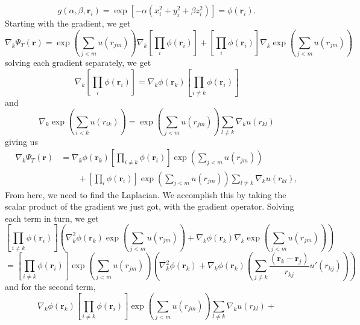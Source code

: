 \documentclass[11pt,a4paper,titlepage]{article}
\begin{document}
\begin{equation*}
    g(\alpha,\beta,\mathbf{r}_i) = \exp{\left[-\alpha(x_i^2+y_i^2+\beta
    z_i^2)\right]}= \phi(\mathbf{r}_i).
\end{equation*}
Starting with the gradient, we get
\begin{equation}
  \nabla_k\Psi_T(\mathbf{r}) = \exp{\left(\sum_{j<m}u(r_{jm})\right)}\nabla_k\left[\prod_{i}\phi(\mathbf{r}_i)\right] + \left[\prod_{i}\phi(\mathbf{r}_i)\right]\nabla_k\exp{\left(\sum_{j<m}u(r_{jm})\right)}
\end{equation}
solving each gradient separately, we get
\begin{equation*}
\nabla_k\left[\prod_{i}\phi(\mathbf{r}_i)\right] = \nabla_k\phi(\mathbf{r}_k)\left[\prod_{i\ne k}\phi(\mathbf{r}_i)\right]
\end{equation*}
and 
\begin{equation*}
\nabla_k\exp{\left(\sum_{i<k}u(r_{ik})\right)} = \exp{\left(\sum_{j<m}u(r_{jm})\right)}\sum_{l\ne k}\nabla_k u(r_{kl})
\end{equation*}
giving us 
\begin{align*}
  \nabla_k\Psi_T(\mathbf{r}) &= \nabla_k\phi(\mathbf{r}_k)\left[\prod_{i\ne k}\phi(\mathbf{r}_i)\right]\exp{\left(\sum_{j<m}u(r_{jm})\right)}
  \\
  &\qquad
  +  \left[\prod_i\phi(\mathbf{r}_i)\right]
  \exp{\left(\sum_{j<m}u(r_{jm})\right)}\sum_{l\ne k}\nabla_k u(r_{kl}),
\end{align*}
From here, we need to find the Laplacian. We accomplish this by taking the scalar product of the gradient we just got, with the gradient operator. Solving each term in turn, we get
\begin{equation*}
\left[\prod_{i\ne k}\phi(\mathbf{r}_i)\right]\left( \nabla_k^2\phi(\mathbf{r}_k) \exp{\left(\sum_{j<m}u(r_{jm})\right)} + \nabla_k\phi(\mathbf{r}_k)\nabla_k\exp{\left(\sum_{j<m}u(r_{jm})\right)}\right)
\end{equation*}
\begin{equation*}
= \left[\prod_{i\ne k}\phi(\mathbf{r}_i)\right]\exp{\left(\sum_{j<m}u(r_{jm})\right)}\left( \nabla_k^2\phi(\mathbf{r}_k)  + \nabla_k\phi(\mathbf{r}_k)\left(\sum_{j\ne k}\frac{(\mathbf{r}_k-\mathbf{r}_j)}{r_{kj}}u'(r_{kj})\right)\right)
\end{equation*}
and for the second term, 
\begin{equation*}
\nabla_k\phi(\mathbf{r}_k)\left[\prod_{i\ne k}\phi(\mathbf{r}_i)\right]\exp{\left(\sum_{j<m}u(r_{jm})\right)}\sum_{l\ne k}\nabla_k u(r_{kl}) + 
\end{equation*}
\end{document}
